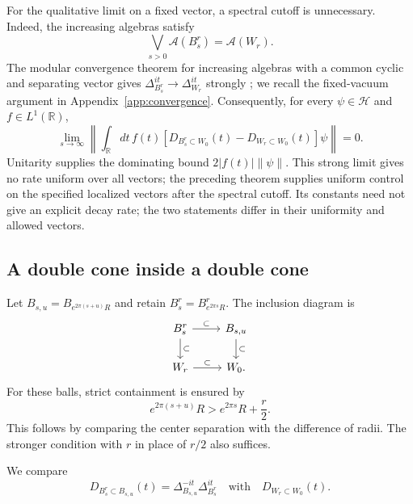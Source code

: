 \documentclass[a4paper,11pt]{article}
\theoremstyle{definition}
\begin{document}
For the qualitative limit on a fixed vector, a spectral cutoff is unnecessary. Indeed, the increasing algebras satisfy
\begin{equation}
 \bigvee_{s>0}\mathcal A(B_s^r)=\mathcal A(W_r).
\end{equation}
The modular convergence theorem for increasing algebras with a common cyclic and separating vector gives $\Delta_{B_s^r}^{it}\to\Delta_{W_r}^{it}$ strongly \cite{revolutionizing,takesaki2}; we recall the fixed-vacuum argument in Appendix~\ref{app:convergence}. Consequently, for every $\psi\in\mathcal H$ and $f\in L^1(\mathbb R)$,
\begin{equation}
 \lim_{s\to\infty}\left\|\int_{\mathbb R}dt\,f(t)
 [D_{B_s^r\subset W_0}(t)-D_{W_r\subset W_0}(t)]\psi\right\|=0.
 \label{eq:approx-uncut-wedge-limit}
\end{equation}
Unitarity supplies the dominating bound $2|f(t)|\|\psi\|$. This strong limit gives no rate uniform over all vectors; the preceding theorem supplies uniform control on the specified localized vectors after the spectral cutoff. Its constants need not give an explicit decay rate; the two statements differ in their uniformity and allowed vectors.

\subsection{A double cone inside a double cone}\label{subsection:coneinsidecone}

Let $B_{s,u}=B_{e^{2\pi(s+u)}R}$ and retain $B_s^r=B_{e^{2\pi s}R}^r$. The inclusion diagram is
\begin{equation}
 \begin{tikzcd}
 B_s^r\arrow[r,"\subset"]\arrow[d,"\subset"]
 &B_{s,u}\arrow[d,"\subset"]\\
 W_r\arrow[r,"\subset"]&W_0.
 \end{tikzcd}
\end{equation}
For these balls, strict containment is ensured by
\begin{equation}
 e^{2\pi(s+u)}R>e^{2\pi s}R+\frac r2.
 \label{eq:approx-ball-containment}
\end{equation}
This follows by comparing the center separation with the difference of radii. The stronger condition with $r$ in place of $r/2$ also suffices.

We compare
\begin{equation}
 D_{B_s^r\subset B_{s,u}}(t)=\Delta_{B_{s,u}}^{-it}\Delta_{B_s^r}^{it}
 \quad\text{with}\quad D_{W_r\subset W_0}(t).
\end{equation}
\end{document}
